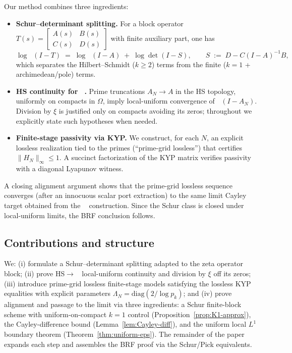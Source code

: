\documentclass[11pt]{article}
\theoremstyle{remark}
\DeclareMathOperator{\dettwo}{det_2}
\begin{document}
Our method combines three ingredients:
\begin{itemize}
 \item \textbf{Schur--determinant splitting.} For a block operator \(T(s)=\begin{bmatrix}A(s)&B(s)\\ C(s)&D(s)\end{bmatrix}\) with finite auxiliary part, one has
 \[
  \log\dettwo(I-T)\;=\;\log\dettwo(I-A)\; +\; \log\det(I-S),\qquad S\;:=\;D-C(I-A)^{-1}B,
 \]
 which separates the Hilbert--Schmidt (\(k\ge 2\)) terms from the finite (\(k=1\) + archimedean/pole) terms.
\item \textbf{HS continuity for \(\dettwo\).} Prime truncations \(A_N\to A\) in the HS topology, uniformly on compacts in \(\Omega\), imply local-uniform convergence of \(\dettwo(I-A_N)\). Division by \(\xi\) is justified only on compacts avoiding its zeros; throughout we explicitly state such hypotheses when needed.
 \item \textbf{Finite-stage passivity via KYP.} We construct, for each \(N\), an explicit lossless realization tied to the primes (``prime-grid lossless'') that certifies \(\|H_N\|_\infty\le 1\). A succinct factorization of the KYP matrix verifies passivity with a diagonal Lyapunov witness.
\end{itemize}
A closing alignment argument shows that the prime-grid lossless sequence converges (after an innocuous scalar port extraction) to the same limit Cayley target obtained from the \(\dettwo\) construction. Since the Schur class is closed under local-uniform limits, the BRF conclusion follows.

\subsection*{Contributions and structure}
We: (i) formulate a Schur--determinant splitting adapted to the zeta operator block; (ii) prove HS\(\to\)\(\dettwo\) local-uniform continuity and division by \(\xi\) off its zeros; (iii) introduce prime-grid lossless finite-stage models satisfying the lossless KYP equalities with explicit parameters \(\Lambda_N=\mathrm{diag}(2/\log p_k)\); and (iv) prove alignment and passage to the limit via three ingredients: a Schur finite-block scheme with uniform-on-compact $k=1$ control (Proposition~\ref{prop:K1-approx}), the Cayley-difference bound (Lemma~\ref{lem:Cayley-diff}), and the uniform local \(L^1\) boundary theorem (Theorem~\ref{thm:uniform-eps}). The remainder of the paper expands each step and assembles the BRF proof via the Schur/Pick equivalents.
\end{document}
